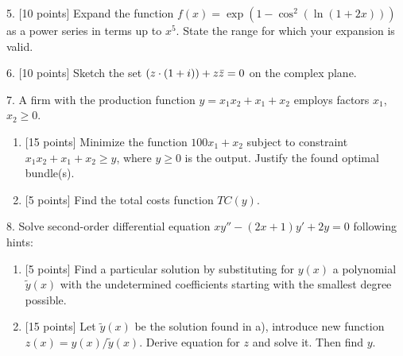 \documentclass[12pt,a4paper]{article}
\let\Re\relax
\DeclareMathOperator{\Re}{Re}
\begin{document}
\newpage
{}

5. {[10 points]} Expand the function $f(x) = \exp(1 - \cos^2 (\ln(1 + 2x)))$ as a power series in terms up to $x^5$. 
  State the range for which your expansion is valid.

 \newpage 



6. {[10 points]} Sketch the set $\Re(z\cdot (1+i))+z\bar z =0$ on the complex plane.


\newpage
{}

	7. A firm with the production function $y=x_1x_2+x_1+x_2$ employs factors $x_1$, $x_2 \geq 0$.
	  \begin{enumerate}[label=\alph*)]
	    \item {[15 points]} Minimize the function $100x_1+x_2$  subject to constraint  $x_1x_2+x_1+x_2 \geq y$, where  $y\geq 0$ is the output. 
	      Justify the found optimal bundle(s).
	    \item {[5 points]} Find the total costs function  $TC(y)$.
	  \end{enumerate}


	  \newpage
{}
	
	8. Solve second-order differential equation $xy''-(2x+1)y'+2y=0$ following hints: 
	\begin{enumerate}[label=\alph*)]
	    \item {[5 points]} Find a particular solution by substituting for $y(x)$ a polynomial $\tilde y(x)$ with 
	      the undetermined coefficients starting with the smallest degree possible.
	    \item {[15 points]} Let $\tilde y(x)$  be the solution found in a),  introduce new function $z(x)=y(x)/\tilde y(x)$. 
	      Derive equation for $z$ and solve it. Then find $y$.
	  \end{enumerate}
      
\end{document}
